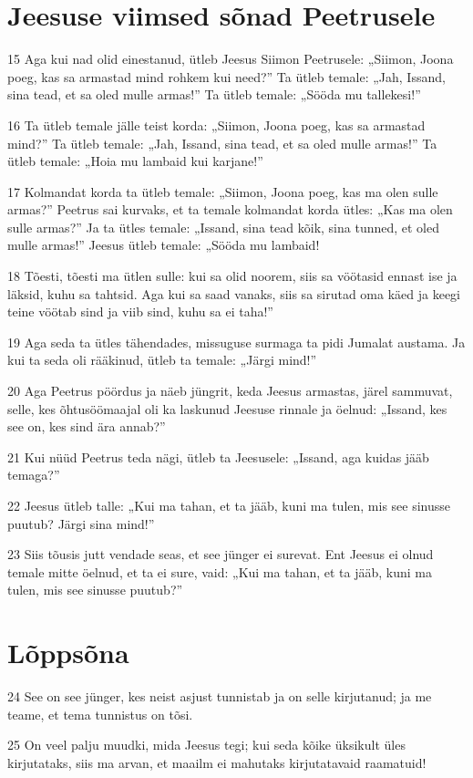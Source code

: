 \section*{Jeesuse viimsed sõnad Peetrusele}

\par 15 Aga kui nad olid einestanud, ütleb Jeesus Siimon Peetrusele: „Siimon, Joona poeg, kas sa armastad mind rohkem kui need?” Ta ütleb temale: „Jah, Issand, sina tead, et sa oled mulle armas!” Ta ütleb temale: „Sööda mu tallekesi!”
\par 16 Ta ütleb temale jälle teist korda: „Siimon, Joona poeg, kas sa armastad mind?” Ta ütleb temale: „Jah, Issand, sina tead, et sa oled mulle armas!” Ta ütleb temale: „Hoia mu lambaid kui karjane!”
\par 17 Kolmandat korda ta ütleb temale: „Siimon, Joona poeg, kas ma olen sulle armas?” Peetrus sai kurvaks, et ta temale kolmandat korda ütles: „Kas ma olen sulle armas?” Ja ta ütles temale: „Issand, sina tead kõik, sina tunned, et oled mulle armas!” Jeesus ütleb temale: „Sööda mu lambaid!
\par 18 Tõesti, tõesti ma ütlen sulle: kui sa olid noorem, siis sa vöötasid ennast ise ja läksid, kuhu sa tahtsid. Aga kui sa saad vanaks, siis sa sirutad oma käed ja keegi teine vöötab sind ja viib sind, kuhu sa ei taha!”
\par 19 Aga seda ta ütles tähendades, missuguse surmaga ta pidi Jumalat austama. Ja kui ta seda oli rääkinud, ütleb ta temale: „Järgi mind!”
\par 20 Aga Peetrus pöördus ja näeb jüngrit, keda Jeesus armastas, järel sammuvat, selle, kes õhtusöömaajal oli ka laskunud Jeesuse rinnale ja öelnud: „Issand, kes see on, kes sind ära annab?”
\par 21 Kui nüüd Peetrus teda nägi, ütleb ta Jeesusele: „Issand, aga kuidas jääb temaga?”
\par 22 Jeesus ütleb talle: „Kui ma tahan, et ta jääb, kuni ma tulen, mis see sinusse puutub? Järgi sina mind!”
\par 23 Siis tõusis jutt vendade seas, et see jünger ei surevat. Ent Jeesus ei olnud temale mitte öelnud, et ta ei sure, vaid: „Kui ma tahan, et ta jääb, kuni ma tulen, mis see sinusse puutub?”

\section*{Lõppsõna}

\par 24 See on see jünger, kes neist asjust tunnistab ja on selle kirjutanud; ja me teame, et tema tunnistus on tõsi.
\par 25 On veel palju muudki, mida Jeesus tegi; kui seda kõike üksikult üles kirjutataks, siis ma arvan, et maailm ei mahutaks kirjutatavaid raamatuid!






